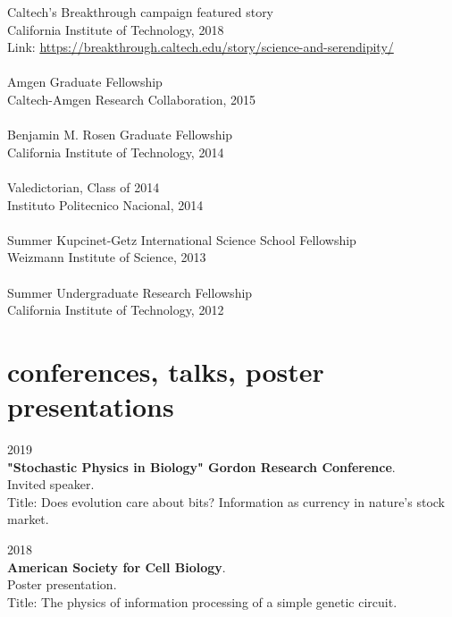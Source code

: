 \documentclass[]{friggeri-cv}
\begin{document}
Caltech's Breakthrough campaign featured story\\
{California Institute of Technology, 2018}\\
Link: \url{https://breakthrough.caltech.edu/story/science-and-serendipity/}\\
\\
Amgen Graduate Fellowship\\
{Caltech-Amgen Research Collaboration, 2015}\\
\\
Benjamin M. Rosen Graduate Fellowship\\
{California Institute of Technology, 2014}\\
\\
Valedictorian, Class of 2014\\
{Instituto Politecnico Nacional, 2014}\\
\\
Summer Kupcinet-Getz International Science School Fellowship\\
{Weizmann Institute of Science, 2013}\\
\\
Summer Undergraduate Research Fellowship\\
{California Institute of Technology, 2012}\\


\section{conferences, talks, poster presentations}

{\small{} 2019}\\
\textbf{"Stochastic Physics in Biology" Gordon Research Conference}.\\
{Invited speaker.}\\
Title: Does evolution care about bits? Information as currency in nature's stock market.

{\small{} 2018}\\
\textbf{American Society for Cell Biology}.\\
{Poster presentation.}\\
Title: The physics of information processing of a simple genetic circuit.
\end{document}
